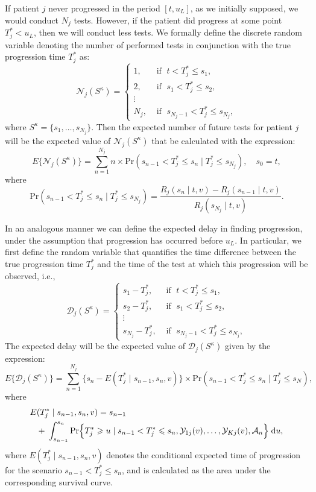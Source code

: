 If patient $j$ never progressed in the period $[t, u_L]$, as we initially supposed, we would conduct $N_j$ tests. However, if the patient did progress at some point $T_j^* < u_L$, then we will conduct less tests. We formally define the discrete random variable denoting the number of performed tests in conjunction with the true progression time $T_j^*$ as:
\[
\mathcal N_j (S^\kappa) = \left \{
\begin{array}{ll}
1, & \mbox{ if } \; t < T^*_j \leq s_1,\\
2, & \mbox{ if } \; s_1 < T^*_j \leq s_2,\\
\vdots&\\
N_j, & \mbox{ if } \; s_{N_j-1} < T^*_j \leq s_{N_j},
\end{array}
\right.
\]
where $S^\kappa = \{s_1, \ldots, s_{N_j}\}$. Then the expected number of future tests for patient $j$ will be the expected value of $\mathcal N_j (S^\kappa)$ that be calculated with the expression:
\begin{equation}
E \big \{\mathcal N_j(S^\kappa)\big\} = \sum_{n = 1}^{N_j} n \times \mbox{Pr}(s_{n-1} < T^*_j \leq s_n \mid T^*_j \leq s_{N_j}), \quad s_0 = t,
\label{eq:exp_tests}
\end{equation}
where 
\[
\mbox{Pr}(s_{n-1} < T^*_j \leq s_n \mid T^*_j \leq s_{N_j}) = \frac{R_j(s_n \mid t, v) - R_j(s_{n-1} \mid t, v)}{R_j(s_{N_j} \mid t, v)}.
\]

In an analogous manner we can define the expected delay in finding progression, under the assumption that progression has occurred before $u_L$. In particular, we first define the random variable that quantifies the time difference between the true progression time $T_j^*$ and the time of the test at which this progression will be observed, i.e.,
\[
\mathcal D_j (S^\kappa) = \left \{
\begin{array}{ll}
s_1 - T_j^*, & \mbox{ if } \; t < T^*_j \leq s_1,\\
s_2 - T_j^*, & \mbox{ if } \; s_1 < T^*_j \leq s_2,\\
\vdots&\\
s_{N_j} - T_j^*, & \mbox{ if } \; s_{N_j-1} < T^*_j \leq s_{N_j},
\end{array}
\right.
\]
The expected delay will be the expected value of $\mathcal D_j (S^\kappa)$ given by the expression:
\begin{equation}
E \big \{ \mathcal D_j(S^\kappa)\big\} = \sum_{n = 1}^{N_j} \Big\{s_n - E(T^*_j \mid s_{n-1}, s_n, v)\Big\} \times \mbox{Pr}(s_{n-1} < T^*_j \leq s_n\mid T^*_j \leq s_N),
\label{eq:exp_delay}
\end{equation}
where
\begin{eqnarray*}
\lefteqn{E(T^*_j \mid s_{n-1}, s_n, v) = s_{n-1}}\\
&& + \; \int_{s_{n-1}}^{s_n} \mbox{Pr}\Big\{T^*_j \geq u \mid s_{n-1} < T^*_j \leq s_n, \mathcal{Y}_{1j}(v), \ldots, \mathcal{Y}_{Kj}(v), \mathcal{A}_n\Big\} \; \mathrm{d}u,
\end{eqnarray*}
where $E(T^*_j \mid s_{n-1}, s_n, v)$ denotes the conditional expected time of progression for the scenario $s_{n-1} < T^*_j \leq s_n$, and is calculated as the area under the corresponding survival curve.

